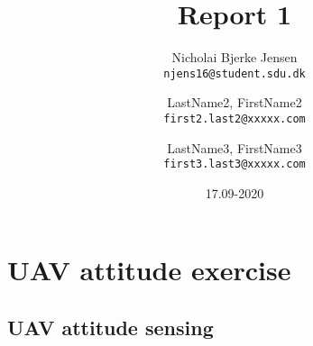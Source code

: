 \documentclass[a4paper,11pt]{article}
\begin{document}
\author{
  Nicholai Bjerke Jensen \\
  \texttt{njens16@student.sdu.dk}
  \and LastName2,
  FirstName2\\
  \texttt{first2.last2@xxxxx.com}
  \and LastName3,
  FirstName3\\
  \texttt{first3.last3@xxxxx.com}

}
\title{Report 1}
\date{17.09-2020}
\maketitle
\section{}
\section{}
\section{UAV attitude exercise}
\subsection{UAV attitude sensing}
\end{document}
